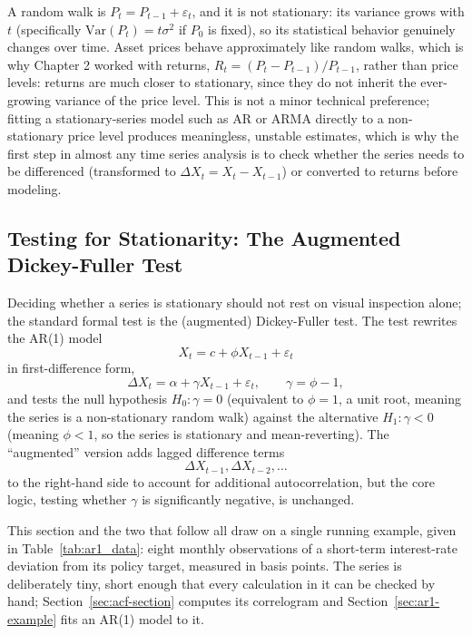 \documentclass[../ai_in_finance]{subfiles}
\begin{document}
A random walk is $P_t = P_{t-1} + \varepsilon_t$, and it is not stationary: its variance grows with $t$ (specifically $\text{Var}(P_t) = t\sigma^2$ if $P_0$ is fixed), so its statistical behavior genuinely changes over time.
Asset prices behave approximately like random walks, which is why Chapter 2 worked with returns, $R_t = (P_t - P_{t-1})/P_{t-1}$, rather than price levels: returns are much closer to stationary, since they do not inherit the ever-growing variance of the price level. This is not a minor technical preference; fitting a stationary-series model such as AR or ARMA directly to a non-stationary price level produces meaningless, unstable estimates, which is why the first step in almost any time series analysis is to check whether the series needs to be differenced (transformed to $\Delta X_t = X_t - X_{t-1}$) or converted to returns before modeling.

\subsection{Testing for Stationarity: The Augmented Dickey-Fuller Test}
\label{sec:adf-test}

Deciding whether a series is stationary should not rest on visual inspection alone; the standard formal test is the (augmented) Dickey-Fuller test. The test rewrites the AR(1) model
$$X_t = c + \phi X_{t-1} + \varepsilon_t$$
in first-difference form,
\begin{equation*}
\Delta X_t = \alpha + \gamma X_{t-1} + \varepsilon_t, \qquad \gamma = \phi - 1,
\end{equation*}
and tests the null hypothesis $H_0: \gamma = 0$ (equivalent to $\phi = 1$, a unit root, meaning the series is a non-stationary random walk) against the alternative $H_1: \gamma < 0$ (meaning $\phi < 1$, so the series is stationary and mean-reverting). The ``augmented'' version adds lagged difference terms
$$\Delta X_{t-1}, \Delta X_{t-2}, \ldots$$
to the right-hand side to account for additional autocorrelation, but the core logic, testing whether $\gamma$ is significantly negative, is unchanged.

This section and the two that follow all draw on a single running example, given in Table~\ref{tab:ar1_data}: eight monthly observations of a short-term interest-rate deviation from its policy target, measured in basis points. The series is deliberately tiny, short enough that every calculation in it can be checked by hand; Section~\ref{sec:acf-section} computes its correlogram and Section~\ref{sec:ar1-example} fits an AR(1) model to it.
\end{document}
